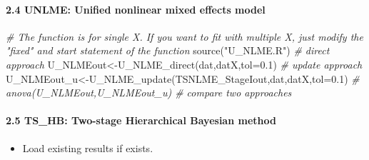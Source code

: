 \documentclass[
]{article}
\newenvironment{Shaded}{\begin{snugshade}}{\end{snugshade}}
\newcommand{\AttributeTok}[1]{\textcolor[rgb]{0.77,0.63,0.00}{#1}}
\newcommand{\CommentTok}[1]{\textcolor[rgb]{0.56,0.35,0.01}{\textit{#1}}}
\newcommand{\FloatTok}[1]{\textcolor[rgb]{0.00,0.00,0.81}{#1}}
\newcommand{\FunctionTok}[1]{\textcolor[rgb]{0.00,0.00,0.00}{#1}}
\newcommand{\NormalTok}[1]{#1}
\newcommand{\OtherTok}[1]{\textcolor[rgb]{0.56,0.35,0.01}{#1}}
\newcommand{\StringTok}[1]{\textcolor[rgb]{0.31,0.60,0.02}{#1}}
\providecommand{\tightlist}{%
  \setlength{\itemsep}{0pt}\setlength{\parskip}{0pt}}
\begin{document}
\hypertarget{unlme-unified-nonlinear-mixed-effects-model}{%
\paragraph{2.4 UNLME: Unified nonlinear mixed effects
model}\label{unlme-unified-nonlinear-mixed-effects-model}}

\begin{Shaded}
\begin{Highlighting}[]
\CommentTok{\# The function is for single X. If you want to fit with multiple X, just modify the "fixed" and start statement of the function}
\FunctionTok{source}\NormalTok{(}\StringTok{"U\_NLME.R"}\NormalTok{)}
\CommentTok{\# direct approach}
\NormalTok{U\_NLMEout}\OtherTok{\textless{}{-}}\FunctionTok{U\_NLME\_direct}\NormalTok{(dat,datX,}\AttributeTok{tol=}\FloatTok{0.1}\NormalTok{)}
\CommentTok{\# update approach}
\NormalTok{U\_NLMEout\_u}\OtherTok{\textless{}{-}}\FunctionTok{U\_NLME\_update}\NormalTok{(TSNLME\_StageIout,dat,datX,}\AttributeTok{tol=}\FloatTok{0.1}\NormalTok{)}
\CommentTok{\# anova(U\_NLMEout,U\_NLMEout\_u) \# compare two approaches}
\end{Highlighting}
\end{Shaded}

\hypertarget{ts_hb-two-stage-hierarchical-bayesian-method}{%
\paragraph{2.5 TS\_HB: Two-stage Hierarchical Bayesian
method}\label{ts_hb-two-stage-hierarchical-bayesian-method}}

\begin{itemize}
\tightlist
\item
  Load existing results if exists.
\end{itemize}
\end{document}
